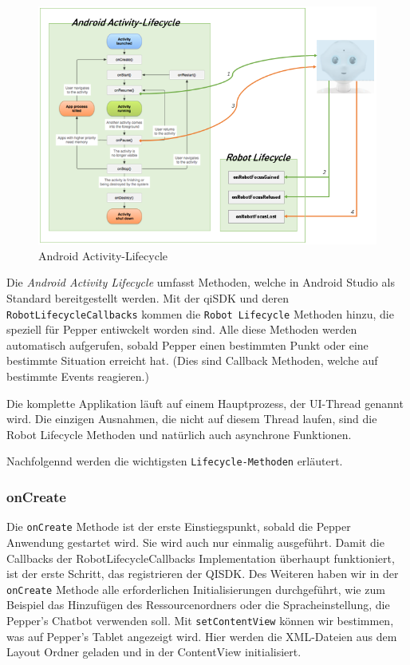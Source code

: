 \begin{figure}[H]
    \includegraphics[width=\textwidth]{Figures/AppChapter/4_1_3.png}
    \caption{Android Activity-Lifecycle \cite{AALife}}
    \label{fig:AAL}
    \centering
\end{figure}

Die \textit{Android Activity Lifecycle} umfasst Methoden, welche in Android Studio als Standard bereitgestellt werden. Mit der qiSDK und deren \verb|RobotLifecycleCallbacks| kommen die \verb|Robot Lifecycle| Methoden hinzu, die speziell für Pepper entiwckelt worden sind. Alle diese Methoden werden automatisch aufgerufen, sobald Pepper einen bestimmten Punkt oder eine bestimmte Situation erreicht hat. (Dies sind Callback Methoden, welche auf bestimmte Events reagieren.)

Die komplette Applikation läuft auf einem Hauptprozess, der UI-Thread genannt wird. Die einzigen Ausnahmen, die nicht auf diesem Thread laufen, sind die Robot Lifecycle Methoden und natürlich auch asynchrone Funktionen.

Nachfolgennd werden die wichtigsten \verb|Lifecycle-Methoden| erläutert.

\subsubsection{onCreate}

Die \verb|onCreate| Methode ist der erste Einstiegspunkt, sobald die Pepper Anwendung gestartet wird. Sie wird auch nur einmalig ausgeführt. Damit die Callbacks der RobotLifecycleCallbacks Implementation überhaupt funktioniert, ist der erste Schritt, das registrieren der QISDK. Des Weiteren haben wir in der \verb|onCreate| Methode alle erforderlichen Initialisierungen durchgeführt, wie zum Beispiel das Hinzufügen des Ressourcenordners oder die Spracheinstellung, die Pepper's Chatbot verwenden soll.
Mit \verb|setContentView| können wir bestimmen, was auf Pepper's Tablet angezeigt wird. Hier werden die XML-Dateien aus dem Layout Ordner geladen und in der ContentView initialisiert. \\

